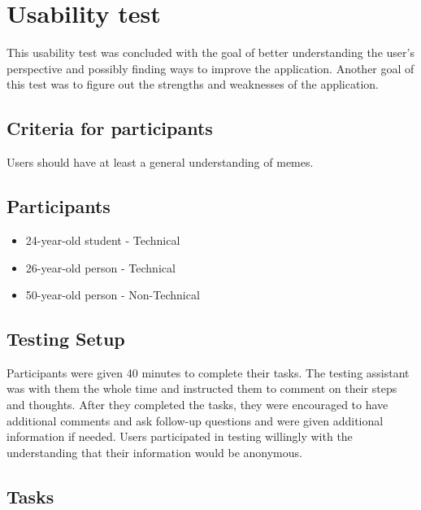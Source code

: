 \section{Usability test}

This usability test was concluded with the goal of better understanding the user's perspective and possibly finding ways to improve the application. Another goal of this test was to figure out the strengths and weaknesses of the application.

\subsection{Criteria for participants}

Users should have at least a general understanding of memes.

\subsection{Participants}
\begin{itemize}
    \item 24-year-old student - Technical
    \item 26-year-old person - Technical
    \item 50-year-old person - Non-Technical
\end{itemize}

\subsection{Testing Setup}

Participants were given 40 minutes to complete their tasks. The testing assistant was with them the whole time and instructed them to comment on their steps and thoughts. After they completed the tasks, they were encouraged to have additional comments and ask follow-up questions and were given additional information if needed. Users participated in testing willingly with the understanding that their information would be anonymous.

\subsection{Tasks}

